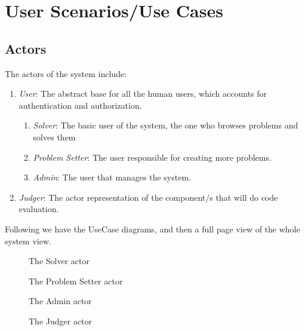 \section{User Scenarios/Use Cases}

\subsection*{Actors}

The actors of the system include:

\begin{enumerate}
    \item \textit{User}: The abstract base for all the human users, which accounts for authentication and authorization.
    \begin{enumerate}
        \item \textit{Solver}: The basic user of the system, the one who browses problems and solves them
        \item \textit{Problem Setter}: The user responsible for creating more problems.
        \item \textit{Admin}: The user that manages the system.
    \end{enumerate}

    \item \textit{Judger}: The actor representation of the component/s that will do code evaluation.
\end{enumerate}

Following we have the UseCase diagrams, and then a full page view of the whole system view.

\begin{figure}[h]
    \centering
    
    \caption{The Solver actor}
\end{figure}

\begin{figure}[h]
    \centering
    
    \caption{The Problem Setter actor}
\end{figure}

\begin{figure}[h]
    \centering
    
    \caption{The Admin actor}
\end{figure}

\begin{figure}[h]
    \centering
    
    \caption{The Judger actor}
\end{figure}

